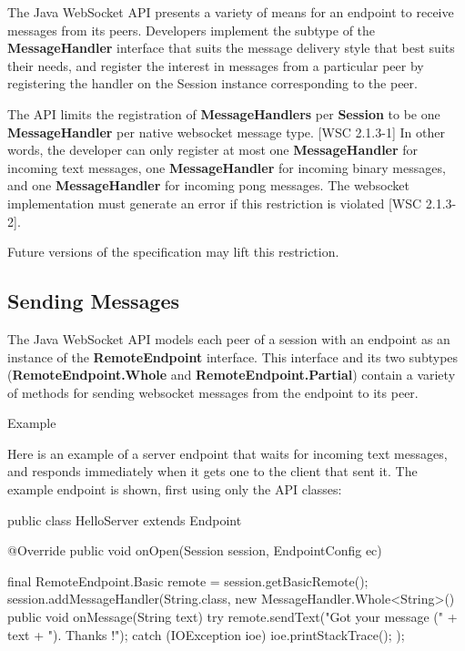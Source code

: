 The Java WebSocket API presents a variety of means for an endpoint to receive messages from its peers. Developers implement the subtype of the \textbf{MessageHandler} interface that suits the message delivery style that best suits their needs, and register the interest in messages from a particular peer by registering the handler on the Session instance corresponding to the peer.

The API limits the registration of \textbf{MessageHandlers} per \textbf{Session} to be one \textbf{MessageHandler} per native websocket message type. [WSC 2.1.3-1] In other words, the developer can only register at most one \textbf{MessageHandler} for incoming text messages, one \textbf{MessageHandler} for incoming binary messages, and one \textbf{MessageHandler} for incoming pong messages. The websocket implementation must generate an error if this restriction is violated [WSC 2.1.3-2].

Future versions of the specification may lift this restriction.

\subsection{Sending Messages}

The Java WebSocket API models each peer of a session with an endpoint as an instance of the \textbf{RemoteEndpoint} interface. This interface and its two subtypes (\textbf{RemoteEndpoint.Whole} and \textbf{RemoteEndpoint.Partial}) contain a variety of methods for sending websocket messages from the endpoint to its peer.

Example

Here is an example of a server endpoint that waits for incoming text messages, and responds immediately when it gets one to the client that sent it. The example endpoint is shown, first using only the API classes:

\begin{listing}{1}
public class HelloServer extends Endpoint {
    @Override
    public void onOpen(Session session, EndpointConfig ec) {
        final RemoteEndpoint.Basic remote = session.getBasicRemote();
        session.addMessageHandler(String.class,
          new MessageHandler.Whole<String>() {
            public void onMessage(String text) {
                try {
                    remote.sendText("Got your message (" + text + "). Thanks !");
                } catch (IOException ioe) {
                    ioe.printStackTrace();
                }
            }
        });

    }
}
\end{listing}

